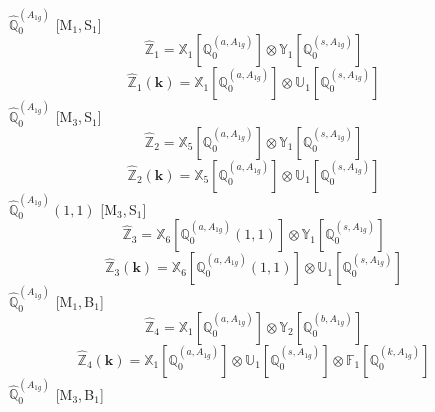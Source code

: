 \documentclass[fleqn,10pt,landscape]{article}
\begin{document}
\begin{itemize}
\vspace{4mm}
\noindent {} $\,\,\,\hat{\mathbb{Q}}_{0}^{(A_{1g})}$ [M$_{1}$,\,S$_{1}$]
\begin{dmath*}
\hat{\mathbb{Z}}_{1}=\mathbb{X}_{1}[\mathbb{Q}_{0}^{(a,A_{1g})}] \otimes\mathbb{Y}_{1}[\mathbb{Q}_{0}^{(s,A_{1g})}]
\end{dmath*}
\begin{dmath*}
\hat{\mathbb{Z}}_{1}(\bm{k})=\mathbb{X}_{1}[\mathbb{Q}_{0}^{(a,A_{1g})}] \otimes\mathbb{U}_{1}[\mathbb{Q}_{0}^{(s,A_{1g})}]
\end{dmath*}
\vspace{4mm}
\noindent {} $\,\,\,\hat{\mathbb{Q}}_{0}^{(A_{1g})}$ [M$_{3}$,\,S$_{1}$]
\begin{dmath*}
\hat{\mathbb{Z}}_{2}=\mathbb{X}_{5}[\mathbb{Q}_{0}^{(a,A_{1g})}] \otimes\mathbb{Y}_{1}[\mathbb{Q}_{0}^{(s,A_{1g})}]
\end{dmath*}
\begin{dmath*}
\hat{\mathbb{Z}}_{2}(\bm{k})=\mathbb{X}_{5}[\mathbb{Q}_{0}^{(a,A_{1g})}] \otimes\mathbb{U}_{1}[\mathbb{Q}_{0}^{(s,A_{1g})}]
\end{dmath*}
\vspace{4mm}
\noindent {} $\,\,\,\hat{\mathbb{Q}}_{0}^{(A_{1g})}(1,1)$ [M$_{3}$,\,S$_{1}$]
\begin{dmath*}
\hat{\mathbb{Z}}_{3}=\mathbb{X}_{6}[\mathbb{Q}_{0}^{(a,A_{1g})}(1,1)] \otimes\mathbb{Y}_{1}[\mathbb{Q}_{0}^{(s,A_{1g})}]
\end{dmath*}
\begin{dmath*}
\hat{\mathbb{Z}}_{3}(\bm{k})=\mathbb{X}_{6}[\mathbb{Q}_{0}^{(a,A_{1g})}(1,1)] \otimes\mathbb{U}_{1}[\mathbb{Q}_{0}^{(s,A_{1g})}]
\end{dmath*}
\vspace{4mm}
\noindent {} $\,\,\,\hat{\mathbb{Q}}_{0}^{(A_{1g})}$ [M$_{1}$,\,B$_{1}$]
\begin{dmath*}
\hat{\mathbb{Z}}_{4}=\mathbb{X}_{1}[\mathbb{Q}_{0}^{(a,A_{1g})}] \otimes\mathbb{Y}_{2}[\mathbb{Q}_{0}^{(b,A_{1g})}]
\end{dmath*}
\begin{dmath*}
\hat{\mathbb{Z}}_{4}(\bm{k})=\mathbb{X}_{1}[\mathbb{Q}_{0}^{(a,A_{1g})}] \otimes\mathbb{U}_{1}[\mathbb{Q}_{0}^{(s,A_{1g})}] \otimes\mathbb{F}_{1}[\mathbb{Q}_{0}^{(k,A_{1g})}]
\end{dmath*}
\vspace{4mm}
\noindent {} $\,\,\,\hat{\mathbb{Q}}_{0}^{(A_{1g})}$ [M$_{3}$,\,B$_{1}$]
\begin{dmath*}

\end{dmath*}
\end{itemize}
\end{document}
